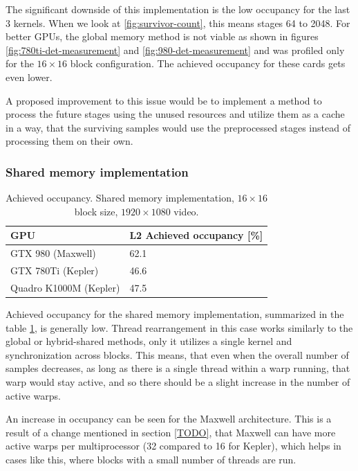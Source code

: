 The significant downside of this implementation is the low occupancy for the last 3 kernels. When we look at \ref{fig:survivor-count}, this means stages 64 to 2048. For better GPUs, the global memory method is not viable as shown in figures \ref{fig:780ti-det-measurement} and \ref{fig:980-det-measurement} and was profiled only for the $16 \times 16$ block configuration. The achieved occupancy for these cards gets even lower.

A proposed improvement to this issue would be to implement a method to process the future stages using the unused resources and utilize them as a cache in a way, that the surviving samples would use the preprocessed stages instead of processing them on their own.

\subsubsection{Shared memory implementation}


\begin{table}[htbp]
\centering
\begin{tabular}{| l | l |}
\hline
GPU & L2 Achieved occupancy [\%] \\
\hline
GTX 980 (Maxwell) & 62.1 \\
\hline
GTX 780Ti (Kepler) & 46.6 \\
\hline
Quadro K1000M (Kepler) & 47.5 \\
\hline
\end{tabular}
\caption{Achieved occupancy. Shared memory implementation, $16 \times 16$ block size, $1920 \times 1080$ video.}
\label{tab:ach-occupancy-shared}
\end{table}

Achieved occupancy for the shared memory implementation, summarized in the table \ref{tab:ach-occupancy-shared}, is generally low. Thread rearrangement in this case works similarly to the global or hybrid-shared methods, only it utilizes a single kernel and synchronization across blocks. This means, that even when the overall number of samples decreases, as long as there is a single thread within a warp running, that warp would stay active, and so there should be a slight increase in the number of active warps.

An increase in occupancy can be seen for the Maxwell architecture. This is a result of a change mentioned in section \ref{TODO}, that Maxwell can have more active warps per multiprocessor (32 compared to 16 for Kepler), which helps in cases like this, where blocks with a small number of threads are run.

